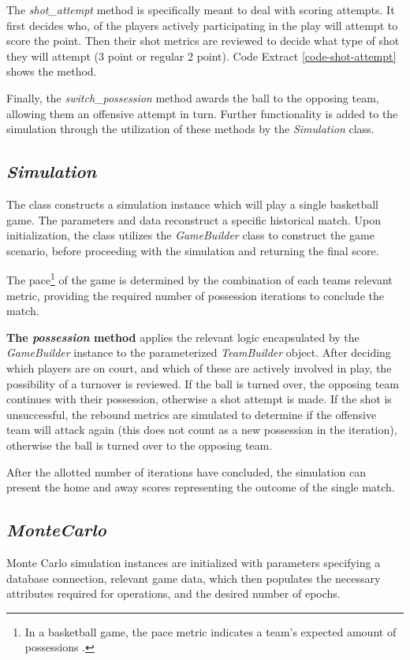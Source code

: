 \documentclass{thesis-ekf}
\theoremstyle{definition}
\theoremstyle{remark}
\begin{document}
The \emph{shot\_attempt} method is specifically meant to deal with scoring attempts. It first decides who, of the players actively participating in the play will attempt to score the point. Then their shot metrics are reviewed to decide what type of shot they will attempt (3 point or regular 2 point). Code Extract \ref{code-shot-attempt} shows the method.


Finally, the \emph{switch\_possession} method awards the ball to the opposing team, allowing them an offensive attempt in turn. Further functionality is added to the simulation through the utilization of these methods by the \emph{Simulation} class.


\subsection{\emph{Simulation}}
The class constructs a simulation instance which will play a single basketball game. The parameters and data reconstruct a specific historical match. Upon initialization, the class utilizes the \emph{GameBuilder} class to construct the game scenario, before proceeding with the simulation and returning the final score.

The pace\footnote{In a basketball game, the pace metric indicates a team's expected amount of possessions \cite{pace}.} of the game is determined by the combination of each teams relevant metric, providing the required number of possession iterations to conclude the match.

\textbf{The \emph{possession} method} applies the relevant logic encapsulated by the \emph{GameBuilder} instance to the parameterized \emph{TeamBuilder} object. After deciding which players are on court, and which of these are actively involved in play, the possibility of a turnover is reviewed. If the ball is turned over, the opposing team continues with their possession, otherwise a shot attempt is made. If the shot is unsuccessful, the rebound metrics are simulated to determine if the offensive team will attack again (this does not count as a new possession in the iteration), otherwise the ball is turned over to the opposing team. 

After the allotted number of iterations have concluded, the simulation can present the home and away scores representing the outcome of the single match.

\subsection{\emph{MonteCarlo}}
Monte Carlo simulation instances are initialized with parameters specifying a database connection, relevant game data, which then populates the necessary attributes required for operations, and the desired number of epochs.
\end{document}
